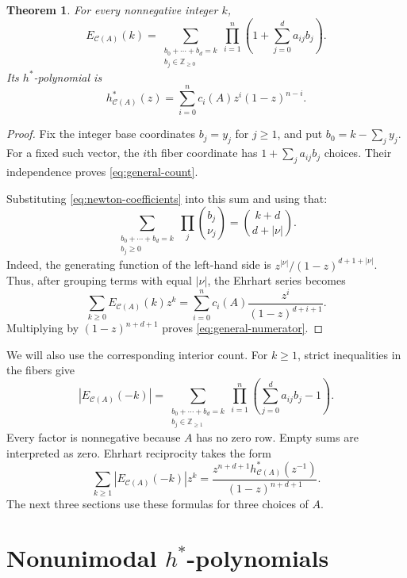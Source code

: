 \documentclass[11pt, letterpaper, english]{amsart}
\theoremstyle{teoremas}
\newtheorem{theorem}{Theorem}[section]
\theoremstyle{definition}
\newcommand{\Z}{\mathbb{Z}}
\newcommand{\cC}{\mathcal C}
\begin{document}
\begin{theorem}\label{thm:general-ehrhart}
For every nonnegative integer $k$,
\begin{equation}\label{eq:general-count}
 E_{\cC(A)}(k)=
 \sum_{\substack{b_0+\cdots+b_d=k\\b_j\in\Z_{\ge0}}}
       \prod_{i=1}^n\left(1+\sum_{j=0}^d a_{ij}b_j\right).
\end{equation}
Its $h^*$-polynomial is
\begin{equation}\label{eq:general-numerator}
 h^*_{\cC(A)}(z)=\sum_{i=0}^n c_i(A)z^i(1-z)^{n-i}.
\end{equation}
\end{theorem}
\begin{proof}
Fix the integer base coordinates $b_j=y_j$ for $j\ge1$, and put
$b_0=k-\sum_j y_j$. For a fixed such vector, the $i$th fiber coordinate
has $1+\sum_j a_{ij}b_j$ choices. Their independence proves
\eqref{eq:general-count}.

Substituting \eqref{eq:newton-coefficients} into this sum and using that:
\[
 \sum_{\substack{b_0+\cdots+b_d=k\\b_j\ge0}}
             \prod_j\binom{b_j}{\nu_j}
 =\binom{k+d}{d+|\nu|}.
\]
Indeed, the generating function of the left-hand side is
$z^{|\nu|}/(1-z)^{d+1+|\nu|}$. Thus, after grouping terms with
equal $|\nu|$, the Ehrhart series becomes
\[
 \sum_{k\ge0}E_{\cC(A)}(k)z^k
 =\sum_{i=0}^n c_i(A)\frac{z^i}{(1-z)^{d+i+1}}.
\]
Multiplying by $(1-z)^{n+d+1}$ proves
\eqref{eq:general-numerator}.
\end{proof}


We will also use the corresponding interior count. For $k\ge1$,
strict inequalities in the fibers give
\begin{equation}\label{eq:general-interior-count}
 |E_{\cC(A)}(-k)|=
 \sum_{\substack{b_0+\cdots+b_d=k\\b_j\in\Z_{\ge1}}}
       \prod_{i=1}^n\left(\sum_{j=0}^d a_{ij}b_j-1\right).
\end{equation}
Every factor is nonnegative because $A$ has no zero row. Empty sums
are interpreted as zero. Ehrhart reciprocity takes the form
\begin{equation}\label{eq:general-reciprocity}
 \sum_{k\ge1}|E_{\cC(A)}(-k)|z^k
 =\frac{z^{n+d+1}h^*_{\cC(A)}(z^{-1})}{(1-z)^{n+d+1}}.
\end{equation}
The next three sections use these formulas for three choices of $A$.

\section{\texorpdfstring{Nonunimodal $h^*$-polynomials}{Nonunimodal h*-polynomials}}\label{sec:nonunimodality}
\end{document}
